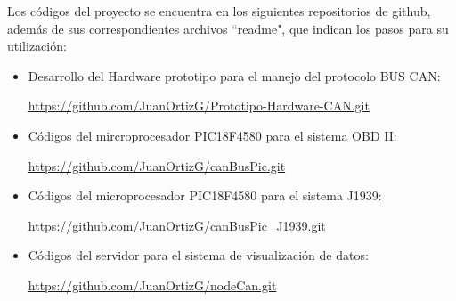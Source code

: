  




Los códigos del proyecto se encuentra en los siguientes repositorios de github, además de sus correspondientes archivos ``readme", que indican los pasos para su utilización: 
\begin{itemize}
    \item Desarrollo del Hardware prototipo para el manejo del protocolo BUS CAN:
   
   \url{https://github.com/JuanOrtizG/Prototipo-Hardware-CAN.git}
    \item Códigos del mircroprocesador PIC18F4580 para el sistema OBD II:
   
    \url{https://github.com/JuanOrtizG/canBusPic.git}
    \item Códigos del microprocesador PIC18F4580 para el sistema J1939: 
   
    \url{https://github.com/JuanOrtizG/canBusPic_J1939.git}
    \item Códigos del servidor para el sistema de visualización de datos: 
   
    \url{https://github.com/JuanOrtizG/nodeCan.git}
\end{itemize}



















